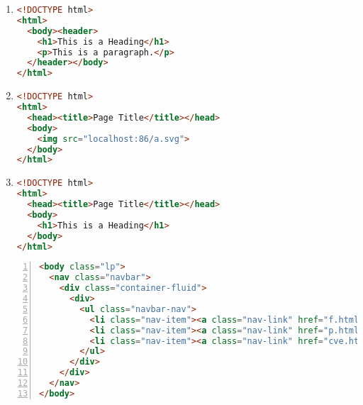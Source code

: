 \documentclass[a4paper,12pt]{article}
\begin{document}
\begin{enumerate}[label=\textbf{\arabic*.}]
\begin{enumerate}
		\item  \hfill \vspace*{-7mm}
    \begin{lstlisting}[language=HTML]
<!DOCTYPE html> 
<html>
  <body><header>
    <h1>This is a Heading</h1>
    <p>This is a paragraph.</p>
  </header></body>
</html>
    \end{lstlisting}
    
		\item  \hfill \vspace*{-7mm}
    \begin{lstlisting}[language=HTML]
<!DOCTYPE html>
<html>
  <head><title>Page Title</title></head>
  <body>
    <img src="localhost:86/a.svg">
  </body>
</html>
    \end{lstlisting}
    
		\item  \hfill \vspace*{-7mm}
    \begin{lstlisting}[language=HTML]
<!DOCTYPE html>
<html>
  <head><title>Page Title</title></head>
  <body>
    <h1>This is a Heading</h1>
  </body>
</html>
    \end{lstlisting}
    
	\end{enumerate}

\end{enumerate}

\newpage
\begin{lstlisting}[language=HTML, caption={Documento en HTML}, label={lst:1}, numbers=left]
<body class="lp">
  <nav class="navbar">
    <div class="container-fluid">
      <div>
        <ul class="navbar-nav">
          <li class="nav-item"><a class="nav-link" href="f.html">Info</a></li>
          <li class="nav-item"><a class="nav-link" href="p.html">Precios</a></li>
          <li class="nav-item"><a class="nav-link" href="cve.html">CVE</a></li>
        </ul>
      </div>
    </div>
  </nav>
</body>
\end{lstlisting}
\end{document}
